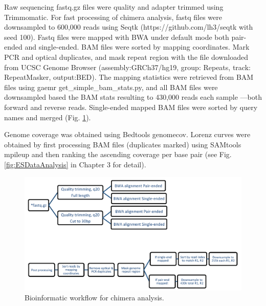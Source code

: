 Raw sequencing fastq.gz files were quality and adapter trimmed using Trimmomatic. For fast processing of chimera analysis, fastq files were downsampled to 600,000 reads using Seqtk (https:\slash \slash github.com\slash lh3\slash seqtk with seed 100). Fastq files were mapped with BWA under default mode both pair-ended and single-ended. BAM files were sorted by mapping coordinates. Mark PCR and optical duplicates, and mask repeat region with the file downloaded from UCSC Genome Browser (assembly:GRCh37\slash hg19, group: Repeats, track: RepeatMasker, output:BED). The mapping statistics were retrieved from BAM files using gaemr get\_simple\_bam\_stats.py, and all BAM files were downsampled based the BAM stats resulting to 430,000 reads each sample ---both forward and reverse reads. Single-ended mapped BAM files were sorted by query names and merged (Fig. \ref{fig:Chimera_Mapping}). 

Genome coverage was obtained using Bedtools genomecov. Lorenz curves were obtained by first processing BAM files (duplicates marked) using SAMtools mpileup and then ranking the ascending coverage per base pair (see Fig. \ref{fig:ESDataAnalysis} in Chapter 3 for detail). 

\begin{figure}
\centering
\includegraphics[keepaspectratio,width=\textwidth]{./figures/Chimera_Mapping}
\caption[Bioinformatic workflow for chimera analysis]{Bioinformatic workflow for chimera analysis.}
\label{fig:Chimera_Mapping}
\end{figure}


